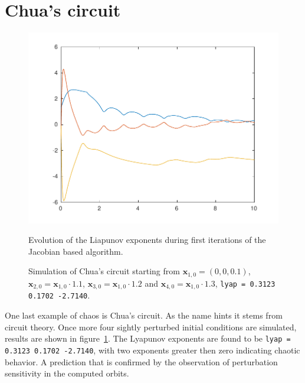 \section{Chua's circuit}
\begin{figure}
\includegraphics{./plots/liapunovChua.pdf}
\caption{Evolution of the Liapunov exponents during first iterations of the Jacobian based algorithm.}

\caption{Simulation of Chua's circuit starting from $\mathbf{x}_{1,0} = ( 0 , 0 , 0.1 )$, $\mathbf{x}_{2,0} = \mathbf{x}_{1,0} \cdot 1.1$, $\mathbf{x}_{3,0} = \mathbf{x}_{1,0} \cdot 1.2$ and $\mathbf{x}_{4,0} = \mathbf{x}_{1,0} \cdot 1.3$,  \texttt{lyap =  0.3123    0.1702   -2.7140}.}
\label{fig:chua}
\end{figure}
One last example of chaos is Chua's circuit. As the name hints it stems from circuit theory. Once more four sightly perturbed initial conditions are simulated, results are shown in figure~\ref{fig:chua}. The Lyapunov exponents are found to be \texttt{lyap =  0.3123    0.1702   -2.7140}, with two exponents greater then zero indicating chaotic behavior. A prediction that is confirmed by the observation of perturbation sensitivity in the computed orbits.
